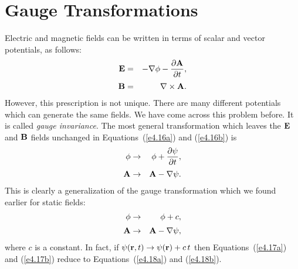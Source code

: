 \section{Gauge Transformations}\label{s4.4}
Electric and magnetic fields can be written in terms of scalar and
vector  potentials, as follows:
\begin{eqnarray}\label{e4.16a}
{\bf E}& =& - \nabla\phi - \frac{\partial {\bf A}}{\partial t},\\[0.5ex]
{\bf B} &=& \nabla\times{\bf A}.\label{e4.16b}
\end{eqnarray}
However, this prescription is not unique. There are many different
potentials which can generate the same  fields. We have come
across this problem before. It is called {\em gauge invariance}. The most general
transformation which leaves the ${\bf E}$ and ${\bf B}$ fields unchanged  in
Equations~(\ref{e4.16a}) and (\ref{e4.16b}) is
\begin{eqnarray}\label{e4.17a}
\phi &\rightarrow& \phi +\frac{\partial \psi}{\partial t},\\[0.5ex]
{\bf A}& \rightarrow& {\bf A} - \nabla\psi.\label{e4.17b}
\end{eqnarray}
This is clearly a generalization of the gauge transformation 
which we found earlier for static fields:
\begin{eqnarray}\label{e4.18a}
\phi &\rightarrow& \phi +c,\\[0.5ex]
{\bf A}& \rightarrow& {\bf A} - \nabla\psi,\label{e4.18b}
\end{eqnarray}
where $c$ is a constant. 
In fact, if $\psi({\bf r}, t)\rightarrow \psi({\bf r}) + c\,t$
 then Equations~(\ref{e4.17a}) and (\ref{e4.17b}) reduce
to Equations~(\ref{e4.18a}) and (\ref{e4.18b}).


